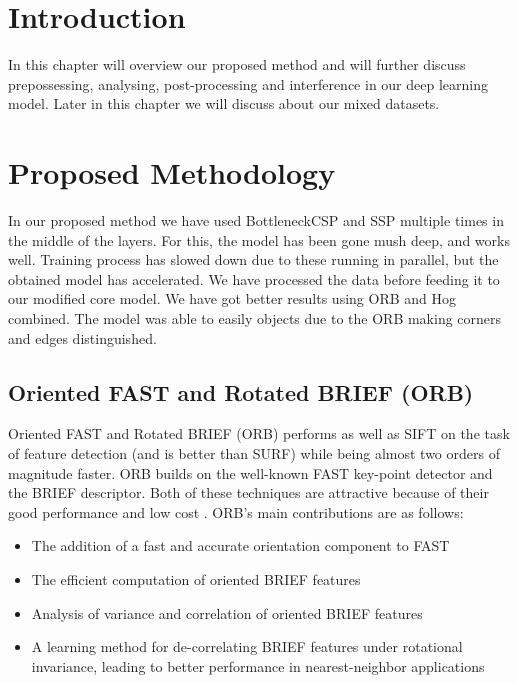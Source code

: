 \section{Introduction}

In this chapter will overview our proposed method and will further discuss prepossessing, analysing, post-processing and interference in our deep learning model. Later in this chapter we will discuss about our mixed datasets.

\section{Proposed Methodology}

In our proposed method we have used BottleneckCSP and SSP multiple times in the middle of the layers. For this, the model has been gone mush deep, and works well. Training process has slowed down due to these running in parallel, but the obtained model has accelerated. We have processed the data before feeding it to our modified core model. We have got better results using ORB and Hog combined. The model was able to easily objects due to the ORB making corners and edges distinguished. 





\subsection{Oriented FAST and Rotated BRIEF (ORB)}
Oriented FAST and Rotated BRIEF (ORB) performs as well as SIFT on the task of feature detection (and is better than SURF) while being almost two orders of magnitude faster. ORB builds on the well-known FAST key-point detector and the BRIEF descriptor. Both of these techniques are attractive because of their good performance and low cost \cite{orb}. ORB’s main contributions are as follows:

\begin{itemize}
    \item The addition of a fast and accurate orientation component to FAST
    \item The efficient computation of oriented BRIEF features
    \item Analysis of variance and correlation of oriented BRIEF features
    \item A learning method for de-correlating BRIEF features under rotational invariance, leading to better performance in nearest-neighbor applications
\end{itemize}


